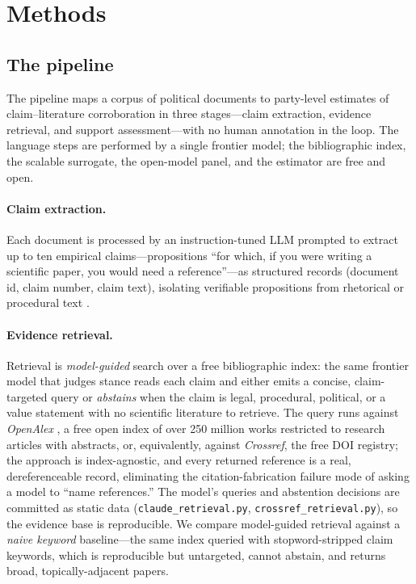 \section{Methods}
\label{sec:methods}

\subsection{The pipeline}
\label{sec:methods-pipeline}
The pipeline maps a corpus of political documents to party-level estimates of claim--literature
corroboration in three stages---claim extraction, evidence retrieval, and support assessment---with no
human annotation in the loop. The language steps are performed by a single frontier model; the
bibliographic index, the scalable surrogate, the open-model panel, and the estimator are free and open.

\paragraph{Claim extraction.} Each document is processed by an instruction-tuned LLM prompted to
extract up to ten empirical claims---propositions ``for which, if you were writing a scientific paper,
you would need a reference''---as structured records (document id, claim number, claim text), isolating
verifiable propositions from rhetorical or procedural text \citep{grimmer2013representational}.

\paragraph{Evidence retrieval.} Retrieval is \emph{model-guided} search over a free bibliographic index:
the same frontier model that judges stance reads each claim and either emits a concise, claim-targeted
query or \emph{abstains} when the claim is legal, procedural, political, or a value statement with no
scientific literature to retrieve. The query runs against \emph{OpenAlex} \citep{priem2022openalex}, a
free open index of over 250 million works restricted to research articles with abstracts, or, equivalently,
against \emph{Crossref}, the free DOI registry; the approach is index-agnostic, and every returned
reference is a real, dereferenceable record, eliminating the citation-fabrication failure mode of asking a
model to ``name references.'' The model's queries and abstention decisions are committed as static data
(\texttt{claude\_retrieval.py}, \texttt{crossref\_retrieval.py}), so the evidence base is reproducible. We
compare model-guided retrieval against a \emph{naive keyword} baseline---the same index queried with
stopword-stripped claim keywords, which is reproducible but untargeted, cannot abstain, and returns broad,
topically-adjacent papers.

